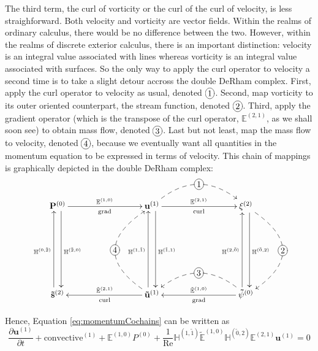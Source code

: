 The third term, the curl of vorticity or the curl of the curl of velocity, is less straighforward. Both velocity and vorticity are vector fields. Within the realms of ordinary calculus, there would be no difference between the two. However, within the realms of discrete exterior calculus, there is an important distinction: velocity is an integral value associated with lines whereas vorticity is an integral value associated with surfaces. So the only way to apply the curl operator to velocity a second time is to take a slight detour accross the double DeRham complex. First, apply the curl operator to velocity as usual, denoted $\xymatrix{*+[o][F-]{1}}$. Second, map vorticity to its outer oriented counterpart, the stream function, denoted $\xymatrix{*+[o][F-]{2}}$. Third, apply the gradient operator (which is the transpose of the curl operator, $\mathbb{E}^{(2,1)}$, as we shall soon see) to obtain mass flow, denoted $\xymatrix{*+[o][F-]{3}}$. Last but not least, map the mass flow to velocity, denoted $\xymatrix{*+[o][F-]{4}}$, because we eventually want all quantities in the momentum equation to be expressed in terms of velocity. This chain of mappings is graphically depicted in the double DeRham complex:
\begin{equation}
    \begin{gathered}
        \xymatrix@=20ex{
            \mathbf{P}^{(0)} \ar[r]^{\mathbb{E}^{(1,0)}}_{\text{grad}} \ar@<1ex>[d]^{\mathbb{H}^{(\tilde{2},0)}} & \mathbf{u}^{(1)} \ar[r]^{\mathbb{E}^{(2,1)}}_{\text{curl}} \ar @/^6ex/ @{-->} [r]|-*+[o][F-]{1} \ar@<1ex>[d]^{\mathbb{H}^{(\tilde{1},1)}} & \mathbf{\xi}^{(2)} \ar@<1ex>[d]^{\mathbb{H}^{(\tilde{0},2)}} \ar @/^10ex/ @{-->} [d]|-*+[o][F-]{2} \\
            \mathbf{\tilde{s}}^{(2)} \ar@<1ex>[u]^{\mathbb{H}^{(0,\tilde{2})}} & \mathbf{\tilde{u}}^{(1)} \ar[l]_{\tilde{\mathbb{E}}^{(2, 1)}}^{\text{curl}} \ar@<1ex>[u]^{\mathbb{H}^{(1,\tilde{1})}} \ar @/^10ex/ @{-->} [u]|-*+[o][F-]{4} & \mathbf{\tilde{\psi}}^{(0)} \ar[l]_{\tilde{\mathbb{E}}^{(1,0)}}^{\text{grad}} \ar @/_6ex/ @{-->} [l]|-*+[o][F-]{3} \ar@<1ex>[u]^{\mathbb{H}^{(2,\tilde{0})}}
        }
    \end{gathered}
\end{equation}

Hence, Equation \ref{eq:momentumCochains} can be written as
\begin{equation}
    \frac{\partial \mathbf{u}^{(1)}}{\partial t} + \text{convective}^{(1)} + \mathbb{E}^{(1,0)} P^{(0)} + \frac{1}{\text{Re}} \mathbb{H}^{(1,\tilde{1})} \tilde{\mathbb{E}}^{(1,0)} \mathbb{H}^{(\tilde{0},2)} \mathbb{E}^{(2,1)} \mathbf{u}^{(1)} = 0
\end{equation}

